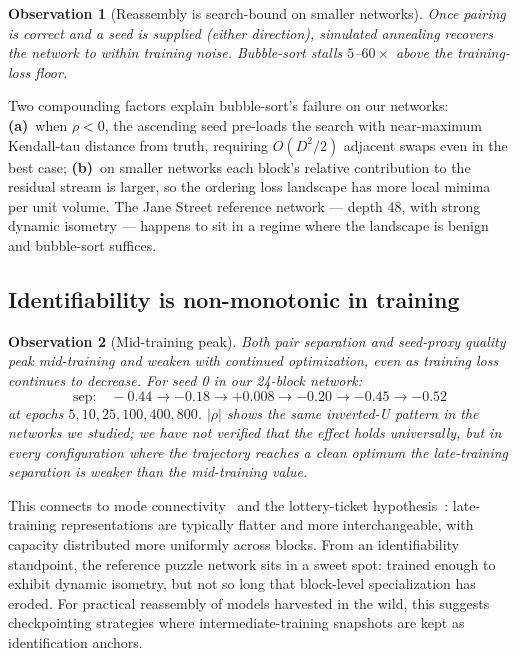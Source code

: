 \documentclass[10pt]{article}
\newtheorem{observation}{Observation}
\theoremstyle{remark}
\begin{document}
\begin{observation}[Reassembly is search-bound on smaller networks]\label{obs:search}
Once pairing is correct and a seed is supplied (either direction),
simulated annealing recovers the network to within training noise.
Bubble-sort stalls $5$--$60\times$ above the training-loss floor.
\end{observation}

Two compounding factors explain bubble-sort's failure on our networks:
\textbf{(a)}~when $\rho<0$, the ascending seed pre-loads the search
with near-maximum Kendall-tau distance from truth, requiring $O(D^2/2)$
adjacent swaps even in the best case;
\textbf{(b)}~on smaller networks each block's relative contribution to
the residual stream is larger, so the ordering loss landscape has more
local minima per unit volume. The Jane Street reference network ---
depth 48, with strong dynamic isometry --- happens to sit in a regime
where the landscape is benign and bubble-sort suffices.

\subsection{Identifiability is non-monotonic in training}

\begin{observation}[Mid-training peak]\label{obs:nonmono}
Both pair separation and seed-proxy quality \emph{peak mid-training and
weaken with continued optimization}, even as training loss continues to
decrease. For seed 0 in our 24-block network:
\[
  \text{sep:}\quad -0.44 \to -0.18 \to +0.008 \to -0.20 \to -0.45 \to -0.52
\]
at epochs $5, 10, 25, 100, 400, 800$. $|\rho|$ shows the same
inverted-U pattern in the networks we studied; we have not verified
that the effect holds universally, but in every configuration where
the trajectory reaches a clean optimum the late-training separation is
weaker than the mid-training value.
\end{observation}

This connects to mode connectivity~\cite{draxler2018mode} and the
lottery-ticket hypothesis~\cite{frankle2019lottery}: late-training
representations are typically flatter and more interchangeable, with
capacity distributed more uniformly across blocks. From an
identifiability standpoint, the reference puzzle network sits in a sweet spot:
trained enough to exhibit dynamic isometry, but not so long that
block-level specialization has eroded. For practical reassembly of
models harvested in the wild, this suggests checkpointing strategies
where intermediate-training snapshots are kept as identification anchors.
\end{document}
